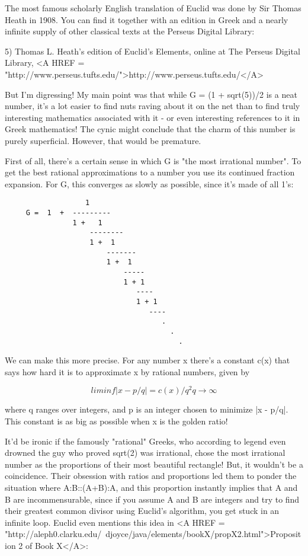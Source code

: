 The most famous scholarly English translation of Euclid was done by 
Sir Thomas Heath in 1908.  You can find it together with an edition
in Greek and a nearly infinite supply of other classical texts at 
the Perseus Digital Library:

5) Thomas L. Heath's edition of Euclid's Elements, online at
The Perseus Digital Library, <A HREF = "http://www.perseus.tufts.edu/">http://www.perseus.tufts.edu/</A>

But I'm digressing!  My main point was that while G = (1 + sqrt(5))/2
is a neat number, it's a lot easier to find nuts raving about it on the 
net than to find truly interesting mathematics associated with it - or 
even interesting references to it in Greek mathematics!  The cynic might 
conclude that the charm of this number is purely superficial.  However,
that would be premature.  

First of all, there's a certain sense in which G is "the most irrational 
number".  To get the best rational approximations to a number you use its 
continued fraction expansion.  For G, this converges as slowly as possible, 
since it's made of all 1's:

\begin{verbatim}
                   1
     G =  1  +  ---------
                1 +   1
                    -------- 
                    1 +  1
                        -------
                        1 +  1
                            -----
                            1 + 1
                               ----  
                               1 + 1
                                  ----
                                     .
                                       .
                                         .
\end{verbatim}
    
We can make this more precise.  For any number x there's a constant
c(x) that says how hard it is to approximate x by rational numbers, 
given by

$$
        lim inf      |x - p/q|   = c(x)/q^{2}
      q \to  \infty 
$$
    
where q ranges over integers, and p is an integer chosen to minimize
|x - p/q|.   This constant is as big as possible when x is the golden
ratio!   

It'd be ironic if the famously "rational" Greeks, who according to 
legend 
even drowned the guy who proved sqrt(2) was irrational, chose the most 
irrational number as the proportions of their most beautiful rectangle!  
But, it wouldn't be a coincidence.  Their obsession with ratios and 
proportions led them to ponder the situation where A:B::(A+B):A,    
and this proportion instantly implies that A and B are incommensurable, 
since if you assume A and B are integers and try to find their greatest 
common divisor using Euclid's algorithm, you get stuck in an infinite loop.
Euclid even mentions this idea in <A HREF = "http://aleph0.clarku.edu/~djoyce/java/elements/bookX/propX2.html">Proposition 2 of Book X</A>:

